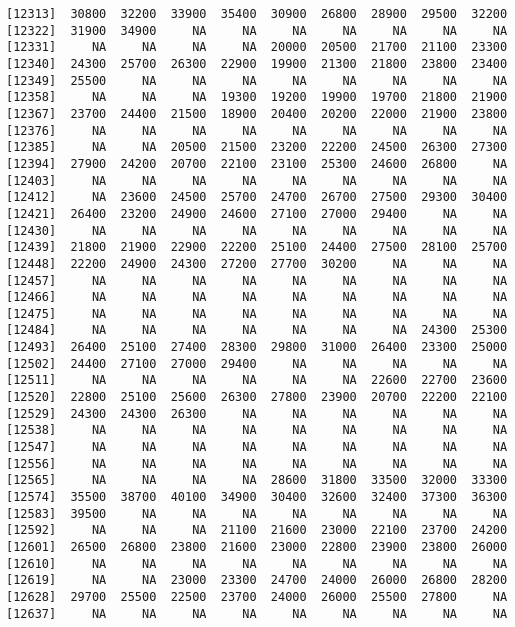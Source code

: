 \documentclass[]{article}
\begin{document}
\begin{verbatim}
[12313]  30800  32200  33900  35400  30900  26800  28900  29500  32200
[12322]  31900  34900     NA     NA     NA     NA     NA     NA     NA
[12331]     NA     NA     NA     NA  20000  20500  21700  21100  23300
[12340]  24300  25700  26300  22900  19900  21300  21800  23800  23400
[12349]  25500     NA     NA     NA     NA     NA     NA     NA     NA
[12358]     NA     NA     NA  19300  19200  19900  19700  21800  21900
[12367]  23700  24400  21500  18900  20400  20200  22000  21900  23800
[12376]     NA     NA     NA     NA     NA     NA     NA     NA     NA
[12385]     NA     NA  20500  21500  23200  22200  24500  26300  27300
[12394]  27900  24200  20700  22100  23100  25300  24600  26800     NA
[12403]     NA     NA     NA     NA     NA     NA     NA     NA     NA
[12412]     NA  23600  24500  25700  24700  26700  27500  29300  30400
[12421]  26400  23200  24900  24600  27100  27000  29400     NA     NA
[12430]     NA     NA     NA     NA     NA     NA     NA     NA     NA
[12439]  21800  21900  22900  22200  25100  24400  27500  28100  25700
[12448]  22200  24900  24300  27200  27700  30200     NA     NA     NA
[12457]     NA     NA     NA     NA     NA     NA     NA     NA     NA
[12466]     NA     NA     NA     NA     NA     NA     NA     NA     NA
[12475]     NA     NA     NA     NA     NA     NA     NA     NA     NA
[12484]     NA     NA     NA     NA     NA     NA     NA  24300  25300
[12493]  26400  25100  27400  28300  29800  31000  26400  23300  25000
[12502]  24400  27100  27000  29400     NA     NA     NA     NA     NA
[12511]     NA     NA     NA     NA     NA     NA  22600  22700  23600
[12520]  22800  25100  25600  26300  27800  23900  20700  22200  22100
[12529]  24300  24300  26300     NA     NA     NA     NA     NA     NA
[12538]     NA     NA     NA     NA     NA     NA     NA     NA     NA
[12547]     NA     NA     NA     NA     NA     NA     NA     NA     NA
[12556]     NA     NA     NA     NA     NA     NA     NA     NA     NA
[12565]     NA     NA     NA     NA  28600  31800  33500  32000  33300
[12574]  35500  38700  40100  34900  30400  32600  32400  37300  36300
[12583]  39500     NA     NA     NA     NA     NA     NA     NA     NA
[12592]     NA     NA     NA  21100  21600  23000  22100  23700  24200
[12601]  26500  26800  23800  21600  23000  22800  23900  23800  26000
[12610]     NA     NA     NA     NA     NA     NA     NA     NA     NA
[12619]     NA     NA  23000  23300  24700  24000  26000  26800  28200
[12628]  29700  25500  22500  23700  24000  26000  25500  27800     NA
[12637]     NA     NA     NA     NA     NA     NA     NA     NA     NA

\end{verbatim}
\end{document}
